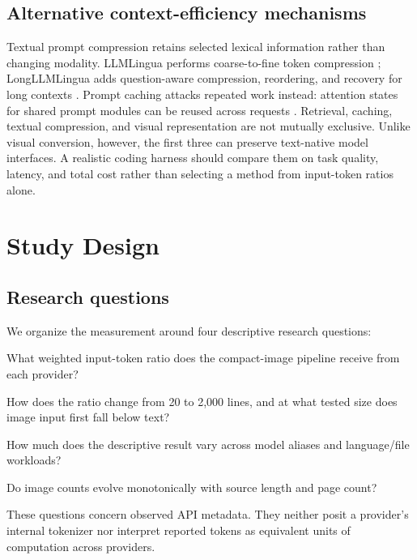 \documentclass[sigconf,nonacm]{acmart}
\begin{document}
\subsection{Alternative context-efficiency mechanisms}

Textual prompt compression retains selected lexical information rather than
changing modality. LLMLingua performs coarse-to-fine token compression
\cite{jiang_2023_llmlingua}; LongLLMLingua adds question-aware compression,
reordering, and recovery for long contexts \cite{jiang_2024_longllmlingua}.
Prompt caching attacks repeated work instead: attention states for shared
prompt modules can be reused across requests \cite{gim_2023_promptcache}.
Retrieval, caching, textual compression, and visual representation are not
mutually exclusive. Unlike visual conversion, however, the first three can
preserve text-native model interfaces. A realistic coding harness should
compare them on task quality, latency, and total cost rather than selecting a
method from input-token ratios alone.

\section{Study Design}

\subsection{Research questions}

We organize the measurement around four descriptive research questions:

\begin{description}[leftmargin=0pt,style=nextline,nosep]
  \item[RQ1: Aggregate accounting.] What weighted input-token ratio does the
  compact-image pipeline receive from each provider?
  \item[RQ2: Scaling and break-even.] How does the ratio change from 20 to
  2,000 lines, and at what tested size does image input first fall below text?
  \item[RQ3: Observed heterogeneity.] How much does the descriptive result vary
  across model aliases and language/file workloads?
  \item[RQ4: Accounting anomalies.] Do image counts evolve monotonically with
  source length and page count?
\end{description}

These questions concern observed API metadata. They neither posit a provider's
internal tokenizer nor interpret reported tokens as equivalent units of
computation across providers.
\end{document}

